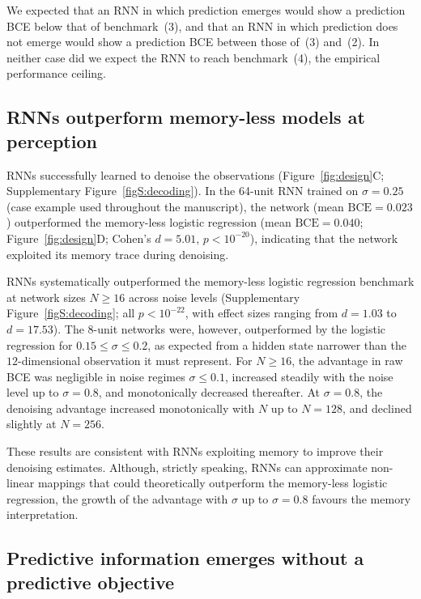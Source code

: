     We expected that an RNN in which prediction emerges would show a prediction BCE below that of benchmark~(3), and that an RNN in which prediction does not emerge would show a prediction BCE between those of~(3) and~(2). In neither case did we expect the RNN to reach benchmark~(4), the empirical performance ceiling.

  \subsection*{RNNs outperform memory-less models at perception}

    RNNs successfully learned to denoise the observations (Figure~\ref{fig:design}C; Supplementary Figure~\ref{figS:decoding}). In the 64-unit RNN trained on $\sigma = 0.25$ (case example used throughout the manuscript), the network (mean $\mathrm{BCE} = 0.023$) outperformed the memory-less logistic regression (mean $\mathrm{BCE} = 0.040$; Figure~\ref{fig:design}D; Cohen's $d = 5.01$, $p < 10^{-20}$), indicating that the network exploited its memory trace during denoising.

    RNNs systematically outperformed the memory-less logistic regression benchmark at network sizes $N \geq 16$ across noise levels (Supplementary Figure~\ref{figS:decoding}; all $p < 10^{-22}$, with effect sizes ranging from $d = 1.03$ to $d = 17.53$). The 8-unit networks were, however, outperformed by the logistic regression for $0.15 \leq \sigma \leq 0.2$, as expected from a hidden state narrower than the $12$-dimensional observation it must represent. For $N \geq 16$, the advantage in raw BCE was negligible in noise regimes $\sigma \leq 0.1$, increased steadily with the noise level up to $\sigma = 0.8$, and monotonically decreased thereafter. At $\sigma = 0.8$, the denoising advantage increased monotonically with $N$ up to $N = 128$, and declined slightly at $N = 256$.

    These results are consistent with RNNs exploiting memory to improve their denoising estimates. Although, strictly speaking, RNNs can approximate non-linear mappings that could theoretically outperform the memory-less logistic regression, the growth of the advantage with $\sigma$ up to $\sigma = 0.8$ favours the memory interpretation.

  \subsection*{Predictive information emerges without a predictive objective}

